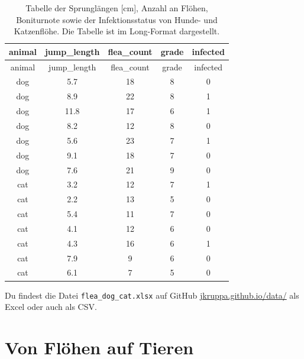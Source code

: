 \documentclass[
  letterpaper,
]{scrbook}
\begin{document}
\hypertarget{tbl-dog-cat-long}{}
\begin{longtable}[]{@{}ccccc@{}}
\caption{\label{tbl-dog-cat-long}Tabelle der Sprunglängen {[}cm{]},
Anzahl an Flöhen, Boniturnote sowie der Infektionsstatus von Hunde- und
Katzenflöhe. Die Tabelle ist im Long-Format dargestellt.}\tabularnewline
\toprule()
animal & jump\_length & flea\_count & grade & infected \\
\midrule()
\endfirsthead
\toprule()
animal & jump\_length & flea\_count & grade & infected \\
\midrule()
\endhead
dog & 5.7 & 18 & 8 & 0 \\
dog & 8.9 & 22 & 8 & 1 \\
dog & 11.8 & 17 & 6 & 1 \\
dog & 8.2 & 12 & 8 & 0 \\
dog & 5.6 & 23 & 7 & 1 \\
dog & 9.1 & 18 & 7 & 0 \\
dog & 7.6 & 21 & 9 & 0 \\
cat & 3.2 & 12 & 7 & 1 \\
cat & 2.2 & 13 & 5 & 0 \\
cat & 5.4 & 11 & 7 & 0 \\
cat & 4.1 & 12 & 6 & 0 \\
cat & 4.3 & 16 & 6 & 1 \\
cat & 7.9 & 9 & 6 & 0 \\
cat & 6.1 & 7 & 5 & 0 \\
\bottomrule()
\end{longtable}

\begin{tcolorbox}[enhanced jigsaw, coltitle=black, titlerule=0mm, bottomrule=.15mm, opacityback=0, opacitybacktitle=0.6, leftrule=.75mm, title=\textcolor{quarto-callout-tip-color}{\faLightbulb}\hspace{0.5em}{Datei für von Flöhen, Hunden und Katzen}, toprule=.15mm, bottomtitle=1mm, toptitle=1mm, left=2mm, breakable, arc=.35mm, colback=white, rightrule=.15mm, colbacktitle=quarto-callout-tip-color!10!white, colframe=quarto-callout-tip-color-frame]
Du findest die Datei \texttt{flea\_dog\_cat.xlsx} auf GitHub
\href{https://github.com/jkruppa/jkruppa.github.io/tree/master/data}{jkruppa.github.io/data/}
als Excel oder auch als CSV.
\end{tcolorbox}

\hypertarget{sec-example-3}{%
\chapter{Von Flöhen auf Tieren}\label{sec-example-3}}
\end{document}
